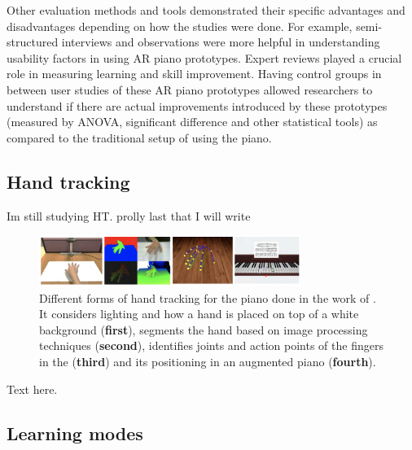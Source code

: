 \documentclass[sigchi, review]{acmart}
\begin{document}
Other evaluation methods and tools demonstrated their specific advantages and disadvantages depending on how the studies were done. For example, semi-structured interviews and observations were more helpful in understanding usability factors in using AR piano prototypes. Expert reviews played a crucial role in measuring learning and skill improvement. Having control groups in between user studies of these AR piano prototypes allowed researchers to understand if there are actual improvements introduced by these prototypes (measured by ANOVA, significant difference and other statistical tools) as compared to the traditional setup of using the piano. 


\subsection{Hand tracking}
\label{subsec: ht}
Im still studying HT. prolly last that I will write

\begin{figure}[t]
    \centering
    \includegraphics[width=8.5cm]{figures/lianghandtrack.png}
    \caption{Different forms of hand tracking for the piano done in the work of \cite{liang2016barehanded}. It considers lighting and how a hand is placed on top of a white background (\textbf{first}), segments the hand based on image processing techniques (\textbf{second}), identifies joints and action points of the fingers in the (\textbf{third}) and its positioning in an augmented piano (\textbf{fourth}). }
    \label{fig:lianghandtrack}
\end{figure}

Text here. 

\subsection{Learning modes}
\label{subsec: learn}
\end{document}
